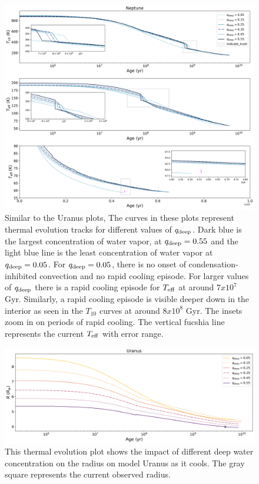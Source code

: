 \documentclass[11pt]{ucscthesisbs}
\begin{document}
{{\begin{figure}[ht]
 \centerline{
  \includegraphics[scale=0.45]{figures/n_cooling_curves_nz_4096_more_qdeeps.png}
 }
\caption[Thermal Evolution Curves for Neptune - Water Vapor Concentration Comparisons]
{Similar to the Uranus plots, The curves in these plots represent thermal evolution tracks for different values of $q_{\rm deep}$. Dark blue is the largest concentration of water vapor, at $q_{\rm deep} = 0.55$ and the light blue line is the least concentration of water vapor at $q_{\rm deep} = 0.05$. For $q_{\rm deep} = 0.05$, there is no onset of condensation-inhibited convection and no rapid cooling episode. For larger values of $q_{\rm deep}$ there is a rapid cooling episode for $T_{\rm eff}$ at around $7 x 10^7$ Gyr. Similarly, a rapid cooling episode is visible deeper down in the interior as seen in the $T_{10}$ curves at around $8 x 10^8$ Gyr.  The insets zoom in on periods of rapid cooling. The vertical fucshia line represents the current $T_{\rm eff}$ with error range.}
\label{fig:evolve_neptune_qdeeps}
\end{figure}



\begin{figure}[ht]
 \centerline{
  \includegraphics[scale=0.45]{figures/u_cooling_radius_nz_4096_logx_more_qdeeps.png}
 }
\caption[Thermal Evolution Curves for Uranus - Radius]
{This thermal evolution plot shows the impact of different deep water concentration on the radius on model Uranus as it cools. The gray square represents the current observed radius.}
\label{fig:evolve_uranus_radius}
\end{figure}


}}
\end{document}
